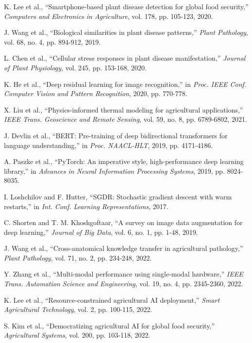\documentclass[conference]{IEEEtran}
\begin{document}
\begin{thebibliography}{00}
K. Lee et al., ``Smartphone-based plant disease detection for global food security,'' \textit{Computers and Electronics in Agriculture}, vol. 178, pp. 105-123, 2020.

J. Wang et al., ``Biological similarities in plant disease patterns,'' \textit{Plant Pathology}, vol. 68, no. 4, pp. 894-912, 2019.

L. Chen et al., ``Cellular stress responses in plant disease manifestation,'' \textit{Journal of Plant Physiology}, vol. 245, pp. 153-168, 2020.

K. He et al., ``Deep residual learning for image recognition,'' in \textit{Proc. IEEE Conf. Computer Vision and Pattern Recognition}, 2020, pp. 770-778.

X. Liu et al., ``Physics-informed thermal modeling for agricultural applications,'' \textit{IEEE Trans. Geoscience and Remote Sensing}, vol. 59, no. 8, pp. 6789-6802, 2021.

J. Devlin et al., ``BERT: Pre-training of deep bidirectional transformers for language understanding,'' in \textit{Proc. NAACL-HLT}, 2019, pp. 4171-4186.

A. Paszke et al., ``PyTorch: An imperative style, high-performance deep learning library,'' in \textit{Advances in Neural Information Processing Systems}, 2019, pp. 8024-8035.

I. Loshchilov and F. Hutter, ``SGDR: Stochastic gradient descent with warm restarts,'' in \textit{Int. Conf. Learning Representations}, 2017.

C. Shorten and T. M. Khoshgoftaar, ``A survey on image data augmentation for deep learning,'' \textit{Journal of Big Data}, vol. 6, no. 1, pp. 1-48, 2019.

J. Wang et al., ``Cross-anatomical knowledge transfer in agricultural pathology,'' \textit{Plant Pathology}, vol. 71, no. 2, pp. 234-248, 2022.

Y. Zhang et al., ``Multi-modal performance using single-modal hardware,'' \textit{IEEE Trans. Automation Science and Engineering}, vol. 19, no. 4, pp. 2345-2360, 2022.

K. Lee et al., ``Resource-constrained agricultural AI deployment,'' \textit{Smart Agricultural Technology}, vol. 2, pp. 100-115, 2022.

S. Kim et al., ``Democratizing agricultural AI for global food security,'' \textit{Agricultural Systems}, vol. 200, pp. 103-118, 2022.


\end{thebibliography}
\end{document}

